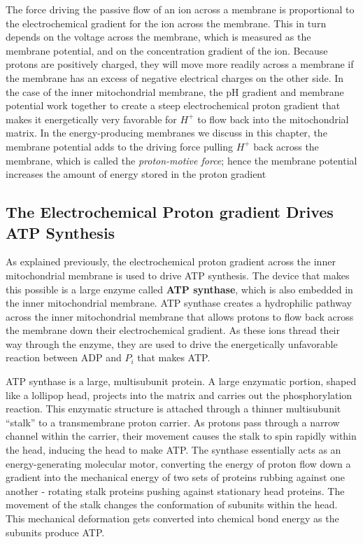 The force driving the passive flow of an ion
across a membrane is proportional to the electrochemical gradient for
the ion across the membrane. This in turn depends on the voltage across
the membrane, which is measured as the membrane potential, and on
the concentration gradient of the ion. Because protons
are positively charged, they will move more readily across a membrane if
the membrane has an excess of negative electrical charges on the other
side. In the case of the inner mitochondrial membrane, the pH gradient
and membrane potential work together to create a steep electrochemical
proton gradient that makes it energetically very favorable for $H^+$ to
flow back into the mitochondrial matrix. In the energy-producing membranes
we discuss in this chapter, the membrane potential adds to the
driving force pulling $H^+$ back across the membrane, which is called the
\textit{proton-motive force}; hence the membrane potential increases the amount
of energy stored in the proton gradient

\subsection{The Electrochemical Proton gradient Drives ATP Synthesis}

As explained previously, the electrochemical proton gradient across the
inner mitochondrial membrane is used to drive ATP synthesis. The device
that makes this possible is a large enzyme called \textbf{ATP synthase}, which
is also embedded in the inner mitochondrial membrane. ATP synthase
creates a hydrophilic pathway across the inner mitochondrial membrane
that allows protons to flow back across the membrane down their
electrochemical gradient. As these ions thread their way
through the enzyme, they are used to drive the energetically unfavorable
reaction between ADP and $P_i$ that makes ATP.

ATP synthase is a large, multisubunit protein. A large
enzymatic portion, shaped like a lollipop head, projects into the matrix
and carries out the phosphorylation reaction. This enzymatic structure is
attached through a thinner multisubunit “stalk” to a transmembrane proton
carrier. As protons pass through a narrow channel within the carrier,
their movement causes the stalk to spin rapidly within the head, inducing
the head to make ATP. The synthase essentially
acts as an energy-generating molecular motor, converting the energy of
proton flow down a gradient into the mechanical energy of two sets of
proteins rubbing against one another - rotating stalk proteins pushing
against stationary head proteins. The movement of the stalk changes the
conformation of subunits within the head. This mechanical deformation
gets converted into chemical bond energy as the subunits produce ATP.

